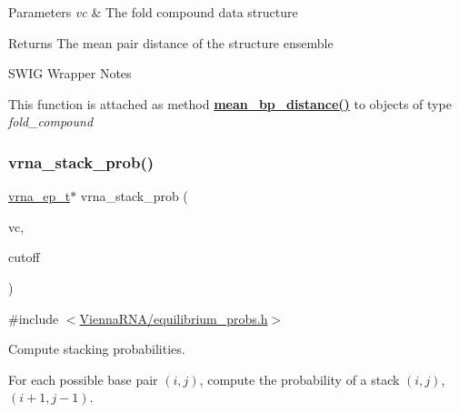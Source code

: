 \begin{DoxyParams}{Parameters}
{\em vc} & The fold compound data structure \\
\hline
\end{DoxyParams}
\begin{DoxyReturn}{Returns}
The mean pair distance of the structure ensemble
\end{DoxyReturn}
\begin{DoxyRefDesc}{S\+W\+I\+G Wrapper Notes}
\item[\mbox{\hyperlink{wrappers__wrappers000085}{S\+W\+I\+G Wrapper Notes}}]This function is attached as method {\bfseries \mbox{\hyperlink{group__pf__fold_ga79cbc375af65f11609feb6b055269e7d}{mean\+\_\+bp\+\_\+distance()}}} to objects of type {\itshape fold\+\_\+compound} \end{DoxyRefDesc}
\mbox{\label{group__pf__fold_ga132664bf29fdc30bb5ea715491d1ab22}} 
\subsubsection{\texorpdfstring{vrna\+\_\+stack\+\_\+prob()}{vrna\_stack\_prob()}}
{\footnotesize\ttfamily \mbox{\hyperlink{group__struct__utils_gab9ac98ab55ded9fb90043b024b915aca}{vrna\+\_\+ep\+\_\+t}}$\ast$ vrna\+\_\+stack\+\_\+prob (\begin{DoxyParamCaption}\item[{\mbox{\hyperlink{group__fold__compound_ga1b0cef17fd40466cef5968eaeeff6166}{vrna\+\_\+fold\+\_\+compound\+\_\+t}} $\ast$}]{vc,  }\item[{double}]{cutoff }\end{DoxyParamCaption})}



{\ttfamily \#include $<$\mbox{\hyperlink{equilibrium__probs_8h}{Vienna\+R\+N\+A/equilibrium\+\_\+probs.\+h}}$>$}



Compute stacking probabilities. 

For each possible base pair $(i,j)$, compute the probability of a stack $(i,j)$, $(i+1, j-1)$.


